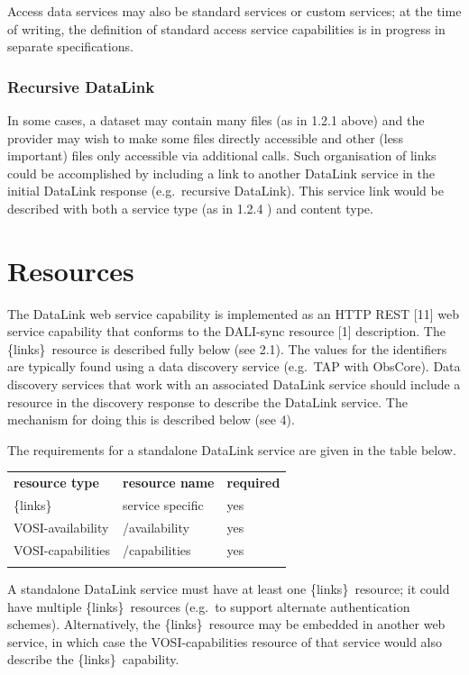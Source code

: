 \documentclass[11pt,a4paper]{ivoa}
\newcommand{\blinks}{\{links\}}
\begin{document}
Access data services may also be standard services or custom services;
at the time of writing, the definition of standard access service
capabilities is in progress in separate specifications.


\subsubsection{Recursive DataLink}

In some cases, a dataset may contain many files (as in 1.2.1 above)
and the provider may wish to make some files directly accessible and
other (less important) files only accessible via additional calls. Such
organisation of links could be accomplished by including a link to
another DataLink service in the initial DataLink response (e.g.\ recursive
DataLink). This service link would be described with both a service type
(as in 1.2.4 ) and content type.


\section{Resources}

The DataLink web service capability is implemented as an HTTP REST
[11] web service capability that conforms to the DALI-sync resource
[1] description. The \blinks\ resource is described fully below (see
2.1). The values for the identifiers are typically found using a data
discovery service (e.g.\ TAP with ObsCore). Data discovery services that
work with an associated DataLink service should include a resource in
the discovery response to describe the DataLink service. The mechanism
for doing this is described below (see 4).

The requirements for a standalone DataLink service are given in the
table below.
\begin{center}
\begin{tabular}{|l|l|l|}
\sptablerule
{\bf resource type} & {\bf resource name} & {\bf required} \\
\sptablerule
\blinks             & service specific    & yes            \\
VOSI-availability   & /availability       & yes            \\
VOSI-capabilities   & /capabilities       & yes            \\
\sptablerule
\end{tabular}
\end{center}

A standalone DataLink service must have at least one \blinks\ resource;
it could have multiple \blinks\ resources (e.g.\ to support alternate
authentication schemes). Alternatively, the \blinks\ resource may be
embedded in another web service, in which case the VOSI-capabilities
resource of that service would also describe the \blinks\ capability.
\end{document}
